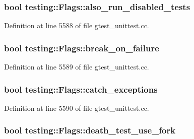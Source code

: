 \subsubsection[{\texorpdfstring{also\+\_\+run\+\_\+disabled\+\_\+tests}{also_run_disabled_tests}}]{\setlength{\rightskip}{0pt plus 5cm}bool testing\+::\+Flags\+::also\+\_\+run\+\_\+disabled\+\_\+tests}\hypertarget{structtesting_1_1_flags_a8ebf8c68f918b9039926b569c880f910}{}\label{structtesting_1_1_flags_a8ebf8c68f918b9039926b569c880f910}


Definition at line 5588 of file gtest\+\_\+unittest.\+cc.

\subsubsection[{\texorpdfstring{break\+\_\+on\+\_\+failure}{break_on_failure}}]{\setlength{\rightskip}{0pt plus 5cm}bool testing\+::\+Flags\+::break\+\_\+on\+\_\+failure}\hypertarget{structtesting_1_1_flags_acccce2a9673bb61751269d2ef9c21c89}{}\label{structtesting_1_1_flags_acccce2a9673bb61751269d2ef9c21c89}


Definition at line 5589 of file gtest\+\_\+unittest.\+cc.

\subsubsection[{\texorpdfstring{catch\+\_\+exceptions}{catch_exceptions}}]{\setlength{\rightskip}{0pt plus 5cm}bool testing\+::\+Flags\+::catch\+\_\+exceptions}\hypertarget{structtesting_1_1_flags_a06984d0553f09716e1bd9f159e7cc644}{}\label{structtesting_1_1_flags_a06984d0553f09716e1bd9f159e7cc644}


Definition at line 5590 of file gtest\+\_\+unittest.\+cc.

\subsubsection[{\texorpdfstring{death\+\_\+test\+\_\+use\+\_\+fork}{death_test_use_fork}}]{\setlength{\rightskip}{0pt plus 5cm}bool testing\+::\+Flags\+::death\+\_\+test\+\_\+use\+\_\+fork}\hypertarget{structtesting_1_1_flags_a7cdef4e6e102771fc15940931dd07e5c}{}\label{structtesting_1_1_flags_a7cdef4e6e102771fc15940931dd07e5c}


